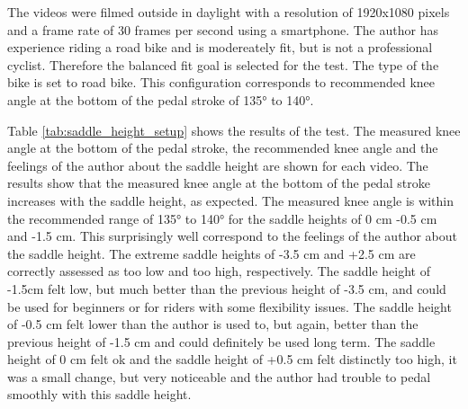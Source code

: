 The videos were filmed outside in daylight with a resolution of 1920x1080 pixels and a frame rate of 30 frames per second using a smartphone. The author has experience riding a road bike and is modereately fit, but is not a professional cyclist. Therefore the balanced fit goal is selected for the test. The type of the bike is set to road bike. This configuration corresponds to recommended knee angle at the bottom of the pedal stroke of 135° to 140°.




Table \ref{tab:saddle_height_setup} shows the results of the test. The measured knee angle at the bottom of the pedal stroke, the recommended knee angle and the feelings of the author about the saddle height are shown for each video. The results show that the measured knee angle at the bottom of the pedal stroke increases with the saddle height, as expected. The measured knee angle is within the recommended range of 135° to 140° for the saddle heights of 0 cm -0.5 cm and -1.5 cm. This surprisingly well correspond to the feelings of the author about the saddle height. The extreme saddle heights of -3.5 cm and +2.5 cm are correctly assessed as too low and too high, respectively. The saddle height of -1.5cm felt low, but much better than the previous height of -3.5 cm, and could be used for beginners or for riders with some flexibility issues. The saddle height of -0.5 cm felt lower than the author is used to, but again, better than the previous height of -1.5 cm and could definitely be used long term. The saddle height of 0 cm felt ok and the saddle height of +0.5 cm felt distinctly too high, it was a small change, but very noticeable and the author had trouble to pedal smoothly with this saddle height.


